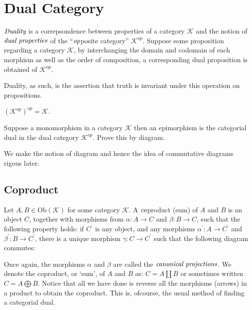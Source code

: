 \section{Dual Category} %
\label{sec:dualcategory}
$\emph{Duality}$ is a correpsondence between properties of a category $\mathcal{K}$ and the notion
of $\emph{dual properties}$ of the ``$\emph{op}$posite category'' $\mathcal{K}^{op}$. Suppose some proposition
regarding a category $\mathcal{K}$, by interchanging the domain and codomain of each morphism as well as
the order of composition, a corresponding dual proposition is obtained of $\mathcal{K}^{op}$.

Duality, as such, is the assertion that truth is invariant under this operation on propositions.
\begin{lem}
 $(\mathcal{K}^{op})^{op} = \mathcal{K}$.
\end{lem}

\begin{exmp}
 Suppose a monomorphism in a category $\mathcal{K}$ then an epimorphism is the categorial dual
 in the dual category $\mathcal{K}^{op}$. Prove this by diagram.
\end{exmp}

\begin{rem}
 We make the notion of diagram and hence the idea of commutative diagrams rigous later.
\end{rem}

\subsection{Coproduct} %
\label{subsec:coproduct}
Let $A,B \in \text{Ob}(\mathcal{K})$ for some category $\mathcal{K}$.
A $\emph{co}$product (sum) of $A$ and $B$ is an object $C$, together with morphisms from
$\alpha: A \to C$ and $\beta: B \to C$, such that the following property holds:
if $C^{'}$ is any object, and any morphisms $\alpha^{'}: A \to C^{'}$ and $\beta^{'}: B \to C^{'}$,
there is a unique morphism $\gamma: C \to C^{'}$ such that the following diagram commutes:


Once again, the morphisms $\alpha$ and $\beta$ are called the $\emph{canonical projections}$.
We denote the coproduct, or `sum', of $A$ and $B$ as: $C = A \coprod B$ or sometimes written $C = A \bigoplus B$.
Notice that all we have done is reverse all the morphisms (arrows) in a product to obtain the coproduct.
This is, ofcourse, the usual method of finding a categorial dual.